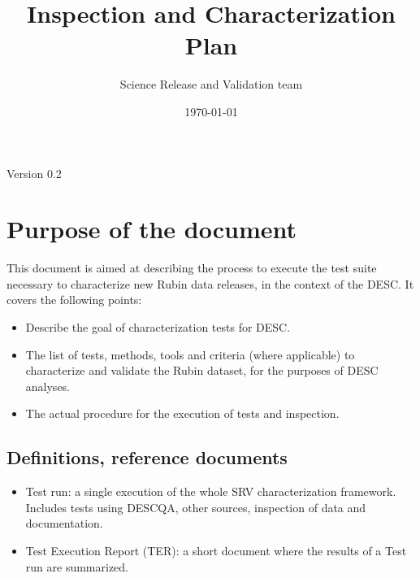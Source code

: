 \documentclass[11pt, a4paper]{article}
\title{Inspection and Characterization Plan} %
\author{Science Release and Validation team} %
\date{\today} %
\begin{document}
\maketitle %

\begin{center}
Version 0.2
\end{center}



\section{Purpose of the document}

This document is aimed at describing the process to execute the test suite necessary to characterize new Rubin data releases, in the context of the DESC. It covers the following points:

\begin{itemize}
\item Describe the goal of characterization tests for DESC.
\item The list of tests, methods, tools and criteria (where applicable) to characterize and validate the Rubin dataset, for the purposes of DESC analyses.
\item The actual procedure for the execution of tests and inspection.
\end{itemize}


\subsection{Definitions, reference documents}

\begin{itemize}
\item Test run: a single execution of the whole SRV characterization framework. Includes tests using DESCQA, other sources, inspection of data and documentation.
\item Test Execution Report (TER): a short document where the results of a Test run are summarized.
\end{itemize}
 
\end{document}
